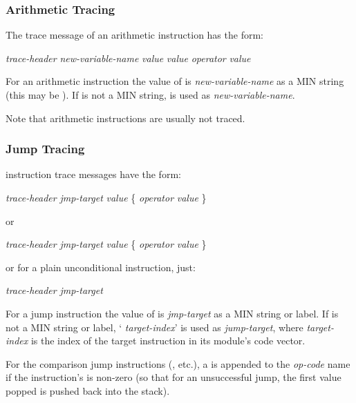 \documentclass[12pt]{article}
\begin{document}
\subsubsection{Arithmetic Tracing}
\label{ARITHMETIC-TRACING}

The trace message of an arithmetic instruction has the form:
\begin{center}
{\em trace-header}\TT{:} {\em new-variable-name} \TT{=} {\em value}
                    \TT{<=} {\em value}\QMARK{}
                    {\em operator} {\em value}
\end{center}
For an arithmetic instruction the value of
 is {\em new-variable-name}
as a MIN string (this may be \TT{*}).
If  is not a MIN string,
\TT{*} is used as {\em new-variable-name}.

Note that arithmetic instructions are usually not traced.

\subsubsection{Jump Tracing}
\label{JUMP-TRACING}

 instruction trace messages have the form:

\begin{center}
{\em trace-header} {\em jmp-target} 
                    \TT{<=} {\em value} \{ {\em operator} {\em value} \}\QMARK{}
\end{center}
or
\begin{center}
{\em trace-header} {\em jmp-target} 
                    \TT{<=} {\em value} \{ {\em operator} {\em value} \}\QMARK{}
\end{center}

or for a plain unconditional  instruction, just:
\begin{center}
{\em trace-header} {\em jmp-target}
\end{center}

For a jump instruction the value of
 is {\em jmp-target}
as a MIN string or label.
If  is not a MIN string or label,
` {\em target-index}' is used as {\em jump-target}, where
{\em target-index} is the index of the target instruction in its
module's code vector.

For the comparison jump instructions (, etc.), a \TT{*}
is appended to the {\em op-code} name if the instruction's
 is non-zero (so that for an unsuccessful jump,
the first value popped is
pushed back into the stack).
\end{document}
